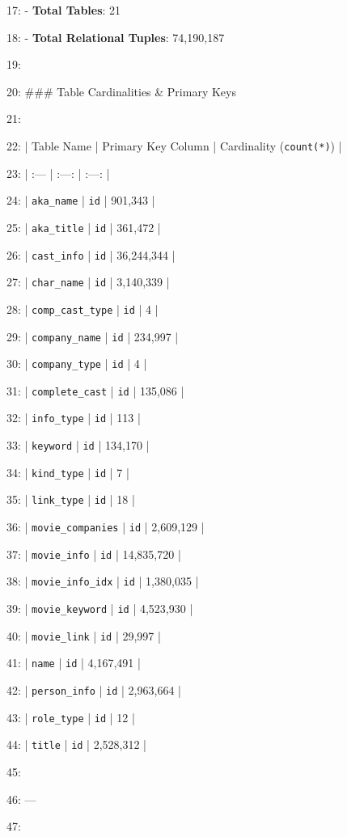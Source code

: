 \documentclass[11pt,a4paper]{article}
\begin{document}
{17: - \textbf{Total Tables}: 21

18: - \textbf{Total Relational Tuples}: 74,190,187

19:

20: \#\#\# Table Cardinalities \& Primary Keys

21:

22: | Table Name | Primary Key Column | Cardinality (\texttt{count(*)}) |

23: | :--- | :---: | :---: |

24: | \texttt{aka\_name} | \texttt{id} | 901,343 |

25: | \texttt{aka\_title} | \texttt{id} | 361,472 |

26: | \texttt{cast\_info} | \texttt{id} | 36,244,344 |

27: | \texttt{char\_name} | \texttt{id} | 3,140,339 |

28: | \texttt{comp\_cast\_type} | \texttt{id} | 4 |

29: | \texttt{company\_name} | \texttt{id} | 234,997 |

30: | \texttt{company\_type} | \texttt{id} | 4 |

31: | \texttt{complete\_cast} | \texttt{id} | 135,086 |

32: | \texttt{info\_type} | \texttt{id} | 113 |

33: | \texttt{keyword} | \texttt{id} | 134,170 |

34: | \texttt{kind\_type} | \texttt{id} | 7 |

35: | \texttt{link\_type} | \texttt{id} | 18 |

36: | \texttt{movie\_companies} | \texttt{id} | 2,609,129 |

37: | \texttt{movie\_info} | \texttt{id} | 14,835,720 |

38: | \texttt{movie\_info\_idx} | \texttt{id} | 1,380,035 |

39: | \texttt{movie\_keyword} | \texttt{id} | 4,523,930 |

40: | \texttt{movie\_link} | \texttt{id} | 29,997 |

41: | \texttt{name} | \texttt{id} | 4,167,491 |

42: | \texttt{person\_info} | \texttt{id} | 2,963,664 |

43: | \texttt{role\_type} | \texttt{id} | 12 |

44: | \texttt{title} | \texttt{id} | 2,528,312 |

45:

46: ---

47:

}
\end{document}
